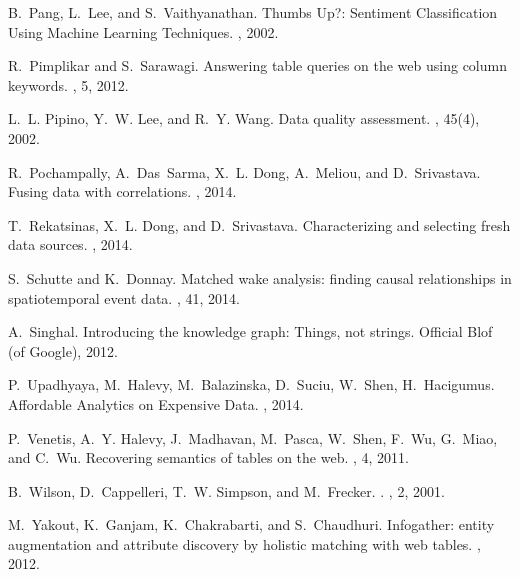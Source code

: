 \documentclass{sig-alternate}
\begin{document}
{\begin{thebibliography}{10}
B.~Pang, L.~Lee, and S.~Vaithyanathan.
\newblock Thumbs Up?: Sentiment Classification Using Machine Learning Techniques.
, 2002.

R.~Pimplikar and S.~Sarawagi.
\newblock Answering table queries on the web using column keywords.
, 5, 2012.

L.~L. Pipino, Y.~W. Lee, and R.~Y. Wang.
\newblock Data quality assessment.
, 45(4), 2002.

R.~Pochampally, A.~Das~Sarma, X.~L. Dong, A.~Meliou, and D.~Srivastava.
\newblock Fusing data with correlations.
, 2014.

T.~Rekatsinas, X.~L. Dong, and D.~Srivastava.
\newblock Characterizing and selecting fresh data sources.
, 2014.

S.~Schutte and K.~Donnay.
\newblock Matched wake analysis: finding causal relationships in spatiotemporal
  event data.
, 41, 2014.

A.~Singhal.
\newblock Introducing the knowledge graph: Things, not strings.
\newblock Official Blof (of Google), 2012.

P.~Upadhyaya, M.~Halevy, M.~Balazinska, D.~Suciu, W.~Shen, H.~Hacigumus.
\newblock Affordable Analytics on Expensive Data.
, 2014.

P.~Venetis, A.~Y. Halevy, J.~Madhavan, M.~Pasca, W.~Shen, F.~Wu, G.~Miao, and
  C.~Wu.
\newblock Recovering semantics of tables on the web.
, 4, 2011.

B.~Wilson, D.~Cappelleri, T.~W. Simpson, and M.~Frecker.
.
, 2, 2001.

M.~Yakout, K.~Ganjam, K.~Chakrabarti, and S.~Chaudhuri.
\newblock Infogather: entity augmentation and attribute discovery by holistic
  matching with web tables.
, 2012.

\end{thebibliography}}
\end{document}
